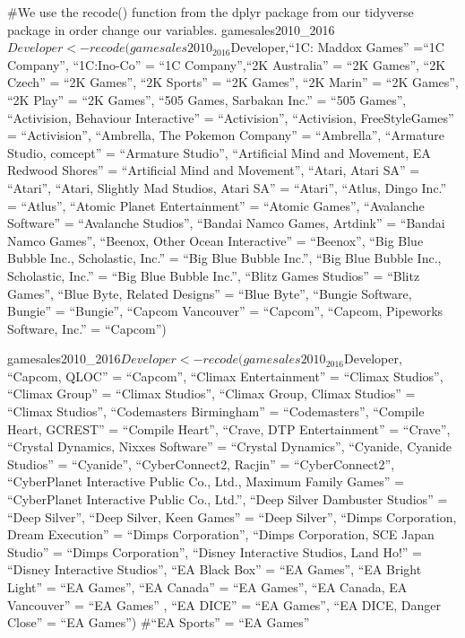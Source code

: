 \documentclass[
]{article}
\begin{document}
\#We use the recode() function from the dplyr package from our tidyverse
package in order change our variables.
gamesales2010\_2016\(Developer <- recode(gamesales2010_2016\)Developer,``1C:
Maddox Games'' =``1C Company'', ``1C:Ino-Co'' = ``1C Company'',``2K
Australia'' = ``2K Games'', ``2K Czech'' = ``2K Games'', ``2K Sports'' =
``2K Games'', ``2K Marin'' = ``2K Games'', ``2K Play'' = ``2K Games'',
``505 Games, Sarbakan Inc.'' = ``505 Games'', ``Activision, Behaviour
Interactive'' = ``Activision'', ``Activision, FreeStyleGames'' =
``Activision'', ``Ambrella, The Pokemon Company'' = ``Ambrella'',
``Armature Studio, comcept'' = ``Armature Studio'', ``Artificial Mind
and Movement, EA Redwood Shores'' = ``Artificial Mind and Movement'',
``Atari, Atari SA'' = ``Atari'', ``Atari, Slightly Mad Studios, Atari
SA'' = ``Atari'', ``Atlus, Dingo Inc.'' = ``Atlus'', ``Atomic Planet
Entertainment'' = ``Atomic Games'', ``Avalanche Software'' = ``Avalanche
Studios'', ``Bandai Namco Games, Artdink'' = ``Bandai Namco Games'',
``Beenox, Other Ocean Interactive'' = ``Beenox'', ``Big Blue Bubble
Inc., Scholastic, Inc.'' = ``Big Blue Bubble Inc.'', ``Big Blue Bubble
Inc., Scholastic, Inc.'' = ``Big Blue Bubble Inc.'', ``Blitz Games
Studios'' = ``Blitz Games'', ``Blue Byte, Related Designs'' = ``Blue
Byte'', ``Bungie Software, Bungie'' = ``Bungie'', ``Capcom Vancouver'' =
``Capcom'', ``Capcom, Pipeworks Software, Inc.'' = ``Capcom'')

gamesales2010\_2016\(Developer <- recode(gamesales2010_2016\)Developer,
``Capcom, QLOC'' = ``Capcom'', ``Climax Entertainment'' = ``Climax
Studios'', ``Climax Group'' = ``Climax Studios'', ``Climax Group, Climax
Studios'' = ``Climax Studios'', ``Codemasters Birmingham'' =
``Codemasters'', ``Compile Heart, GCREST'' = ``Compile Heart'', ``Crave,
DTP Entertainment'' = ``Crave'', ``Crystal Dynamics, Nixxes Software'' =
``Crystal Dynamics'', ``Cyanide, Cyanide Studios'' = ``Cyanide'',
``CyberConnect2, Racjin'' = ``CyberConnect2'', ``CyberPlanet Interactive
Public Co., Ltd., Maximum Family Games'' = ``CyberPlanet Interactive
Public Co., Ltd.'', ``Deep Silver Dambuster Studios'' = ``Deep Silver'',
``Deep Silver, Keen Games'' = ``Deep Silver'', ``Dimps Corporation,
Dream Execution'' = ``Dimps Corporation'', ``Dimps Corporation, SCE
Japan Studio'' = ``Dimps Corporation'', ``Disney Interactive Studios,
Land Ho!'' = ``Disney Interactive Studios'', ``EA Black Box'' = ``EA
Games'', ``EA Bright Light'' = ``EA Games'', ``EA Canada'' = ``EA
Games'', ``EA Canada, EA Vancouver'' = ``EA Games'' , ``EA DICE'' = ``EA
Games'', ``EA DICE, Danger Close'' = ``EA Games'') \#``EA Sports'' =
``EA Games''
\end{document}
